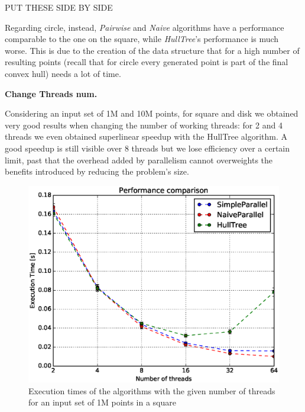 \documentclass[letterpaper]{article}
\newcommand{\mypar}[1]{{\bf #1.}}
\begin{document}
PUT THESE SIDE BY SIDE

Regarding circle, instead, \textit{Pairwise} and \textit{Naive} algorithms have a performance comparable to the one on the square, while \textit{HullTree}'s performance is much worse.
This is due to the creation of the data structure that for a high number of resulting points (recall that for circle every generated point is part of the final convex hull) needs a lot of time.

\mypar{Change Threads num}

Considering an input set of 1M and 10M points, for square and disk we obtained very good results when changing the number of working threads: for 2 and 4 threads we even obtained superlinear speedup with the HullTree algorithm.
A good speedup is still visible over 8 threads but we lose efficiency over a certain limit, past that the overhead added by parallelism cannot overweights the benefits introduced by reducing the problem's size.

\begin{figure}[!ht]\centering
  \includegraphics[scale=0.33]{./plots/xeon_square_1000000.eps}
  \caption{Execution times of the algorithms with the given number of threads for an input set of 1M points in a square\label{Threads time}}
\end{figure}
\end{document}
